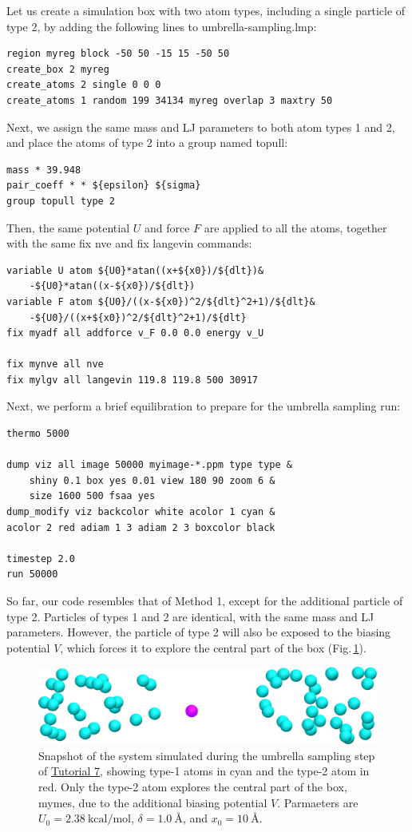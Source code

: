 \documentclass[9pt,tutorial]{livecoms}
\newcommand{\lmpcmd}[1]{\hspace{0pt}\colorbox{listing}{\textcolor{command}{\small{#1}}}\hspace{0pt}} %
\begin{document}
Let us create a simulation box with two atom types, including a single particle of type 2,
by adding the following lines to \lmpcmd{umbrella-sampling.lmp}:
\begin{lstlisting}
region myreg block -50 50 -15 15 -50 50
create_box 2 myreg
create_atoms 2 single 0 0 0
create_atoms 1 random 199 34134 myreg overlap 3 maxtry 50
\end{lstlisting}
Next, we assign the same mass and LJ parameters to both atom types 
1 and 2, and place the atoms of type 2 into a group named \lmpcmd{topull}:
\begin{lstlisting}
mass * 39.948
pair_coeff * * ${epsilon} ${sigma}
group topull type 2
\end{lstlisting}
Then, the same potential $U$ and force $F$ are applied to all the atoms,
together with the same \lmpcmd{fix nve} and \lmpcmd{fix langevin} commands:
\begin{lstlisting}
variable U atom ${U0}*atan((x+${x0})/${dlt})&
    -${U0}*atan((x-${x0})/${dlt})
variable F atom ${U0}/((x-${x0})^2/${dlt}^2+1)/${dlt}&
    -${U0}/((x+${x0})^2/${dlt}^2+1)/${dlt}
fix myadf all addforce v_F 0.0 0.0 energy v_U

fix mynve all nve
fix mylgv all langevin 119.8 119.8 500 30917
\end{lstlisting}
Next, we perform a brief equilibration to prepare for the
umbrella sampling run:
\begin{lstlisting}
thermo 5000

dump viz all image 50000 myimage-*.ppm type type &
    shiny 0.1 box yes 0.01 view 180 90 zoom 6 &
    size 1600 500 fsaa yes
dump_modify viz backcolor white acolor 1 cyan &
acolor 2 red adiam 1 3 adiam 2 3 boxcolor black

timestep 2.0
run 50000
\end{lstlisting}

So far, our code resembles that of Method 1, except for the additional particle
of type 2.  Particles of types 1 and 2 are identical, with the same mass
and LJ parameters.  However, the particle of type 2 will also
be exposed to the biasing potential $V$, which forces it to explore the
central part of the box (Fig.\,\ref{fig:US-system-biased}).

\begin{figure}
\centering
\includegraphics[width=\linewidth]{US-system-biased}
\caption{Snapshot of the system simulated during the umbrella sampling
step of \hyperref[umbrella-sampling-label]{Tutorial 7}, showing type-1 atoms
in cyan and the type-2 atom in red.  Only the type-2 atom explores the central part of the box,
\lmpcmd{mymes}, due to the additional biasing potential $V$. Parmaeters are
$U_0 = 2.38~\text{kcal/mol}$, $\delta = 1.0~\text{\AA{}}$, and $x_0 = 10~\text{\AA{}}$.}
\label{fig:US-system-biased}
\end{figure}
\end{document}
